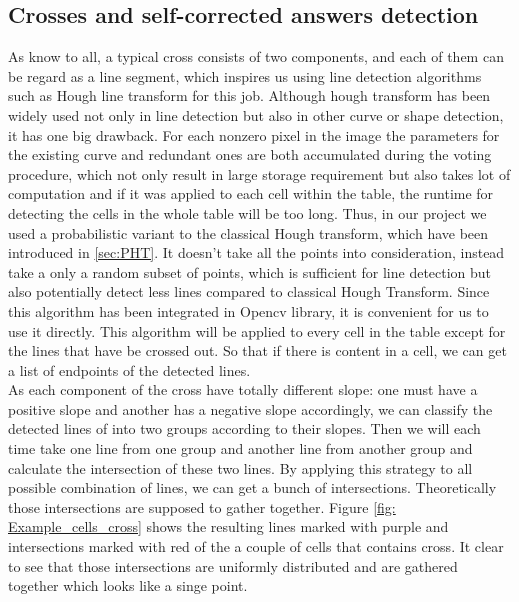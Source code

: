 \documentclass[a4paper,twoside]{article}
\begin{document}
\subsection{Crosses and self-corrected answers detection}
As know to all, a typical cross consists of two components, and each of them can be regard as a line segment, which inspires us using line detection algorithms such as Hough line transform for this job. Although hough transform has been widely used not only in line detection but also in other curve or shape detection, it has one big drawback. For each nonzero pixel in the image the parameters for the existing curve and redundant ones are both accumulated during the voting procedure, which not only result in large storage requirement but also takes lot of computation and if it was applied to each cell within the table, the runtime for detecting the cells in the whole table will be too long. Thus, in our project we used a probabilistic variant to the classical Hough transform, which have been introduced in \ref{sec:PHT}. It doesn't take all the points into consideration, instead take a only a random subset of points, which is sufficient for line detection but also potentially detect less lines compared to classical Hough Transform. Since this algorithm has been integrated in Opencv library, it is convenient for us to use it directly. This algorithm will be applied to every cell in the table except for the lines that have be crossed out. So that if there is content in a cell, we can get a list of endpoints of the detected lines. \\
As each component of the cross have totally different slope: one must have a positive slope and another has a negative slope accordingly, we can classify the detected lines of into two groups according to their slopes. Then we will each time take one line from one group and another line from another group and calculate the intersection of these two lines. By applying this strategy to all possible combination of lines, we can get a bunch of intersections. Theoretically those intersections are supposed to gather together. Figure \ref{fig: Example_cells_cross} shows the resulting lines marked with purple and intersections marked with red of the a couple of cells that contains cross. It clear to see that those intersections are uniformly distributed and are gathered together which looks like a singe point.\\
\end{document}
